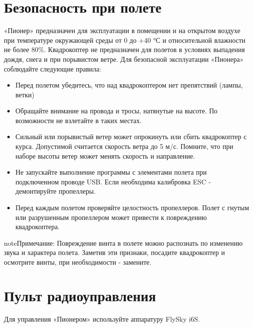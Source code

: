 \documentclass[a4paper,10pt,russian]{sphinxmanual}
\begin{document}
\section{Безопасность при полете}
\label{\detokenize{flight/operation_flight:id1}}\label{\detokenize{flight/operation_flight::doc}}
«Пионер» предназначен для эксплуатации в помещении и на открытом воздухе при температуре окружающей среды от 0 до +40 °С и относительной влажности не более 80\%. Квадрокоптер не предназначен для полетов в условиях выпадения дождя, снега и при порывистом ветре. Для безопасной эксплуатации «Пионера» соблюдайте следующие правила:
\begin{itemize}
\item {} 
Перед полетом убедитесь, что над квадрокоптером нет препятствий (лампы, ветки)

\item {} 
Обращайте внимание на провода и тросы, натянутые на высоте. По возможности не взлетайте в таких местах.

\item {} 
Сильный или порывистый ветер может опрокинуть или сбить квадрокоптер с курса. Допустимой считается скорость ветра до 5 м/с. Помните, что при наборе высоты ветер может менять скорость и направление.

\item {} 
Не запускайте выполнение программы с элементами полета при подключенном проводе USB. Если необходима калибровка ESC - демонтируйте пропеллеры.

\item {} 
Перед каждым полетом проверяйте целостность пропеллеров. Полет с гнутым или разрушенным пропеллером может привести к повреждению квадрокоптера.

\end{itemize}

\begin{sphinxadmonition}{note}{Примечание:}
Повреждение винта в полете можно распознать по изменению звука и характера полета. Заметив эти признаки, посадите квадрокоптер и осмотрите винты, при необходимости - замените.
\end{sphinxadmonition}


\section{Пульт радиоуправления}
\label{\detokenize{flight/rc_unit:id1}}\label{\detokenize{flight/rc_unit::doc}}
Для управления «Пионером» используйте аппаратуру FlySky i6S.
\end{document}
